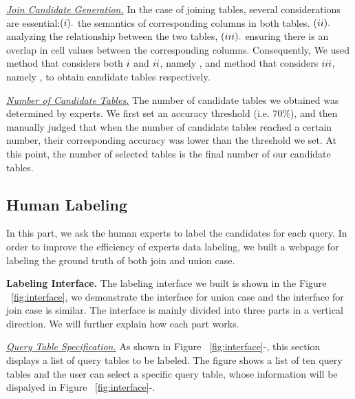 \noindent \underline{\textit{Join Candidate Generation.}}  
In the case of joining tables, several considerations are essential:$(\romannumeral1).$ the semantics of corresponding columns in both tables. $(\romannumeral2).$ analyzing the relationship between the two tables, $(\romannumeral3).$ ensuring there is an overlap in cell values between the corresponding columns. Consequently, We used method that considers both $\romannumeral1$ and $\romannumeral2$, namely \deepjoin, and method that considers $\romannumeral3$, namely \josie, to obtain candidate tables respectively.

\noindent  \underline{\textit{Number of Candidate Tables.}}  The number of candidate tables we obtained was determined by experts. We first set an accuracy threshold (i.e. 70\%), and then manually judged that when the number of candidate tables reached a certain number, their corresponding accuracy was lower than the threshold we set. At this point, the number of selected tables is the final number of our candidate tables.


\subsection{Human Labeling}
In this part, we ask the human experts to label the candidates for each query. In order to improve the efficiency of experts data labeling, we built a webpage for labeling the ground truth of both join and union case.


\noindent \textbf{Labeling Interface.} 
The labeling interface we built is shown in the Figure ~\ref{fig:interface}, we demonstrate the interface for union case and the interface for join case is similar. The interface is mainly divided into three parts in a vertical direction. We will further explain how each part works.

\noindent \underline{\textit{Query Table Specification.}}  
As shown in Figure ~\ref{fig:interface}-, this section displays a list of query tables to be labeled.  The figure shows a list of ten query tables and the user can select a specific query table, whose information will be dispalyed in Figure ~\ref{fig:interface}-.

